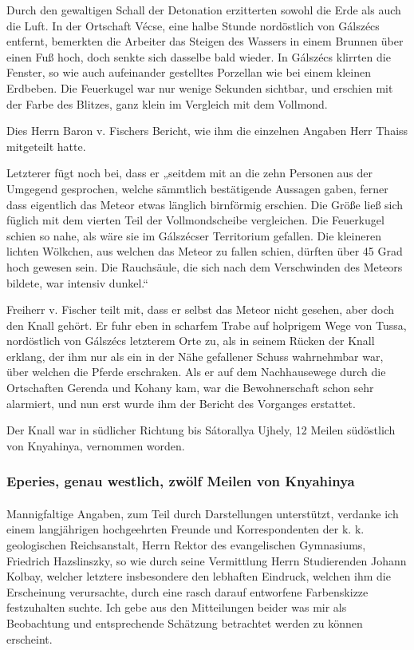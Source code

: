 \documentclass[a4paper, 11pt, oneside, german]{article}
\begin{document}
Durch den gewaltigen Schall der Detonation erzitterten sowohl die Erde als auch die Luft. In der Ortschaft Vécse, eine halbe Stunde nordöstlich von Gálszécs entfernt, bemerkten die Arbeiter das Steigen des Wassers in einem Brunnen über einen Fuß hoch, doch senkte sich dasselbe bald wieder. In Gálszécs klirrten die Fenster, so wie auch aufeinander gestelltes Porzellan wie bei einem kleinen Erdbeben. Die Feuerkugel war nur wenige Sekunden sichtbar, und erschien mit der Farbe des Blitzes, ganz klein im Vergleich mit dem Vollmond.

Dies Herrn Baron v. Fischers Bericht, wie ihm die einzelnen Angaben Herr Thaiss mitgeteilt hatte.

Letzterer fügt noch bei, dass er „seitdem mit an die zehn Personen aus der Umgegend gesprochen, welche sämmtlich bestätigende Aussagen gaben, ferner dass eigentlich das Meteor etwas länglich birnförmig erschien. Die Größe ließ sich füglich mit dem vierten Teil der Vollmondscheibe vergleichen. Die Feuerkugel schien so nahe, als wäre sie im Gálszécser Territorium gefallen. Die kleineren lichten Wölkchen, aus welchen das Meteor zu fallen schien, dürften über 45 Grad hoch gewesen sein. Die Rauchsäule, die sich nach dem Verschwinden des Meteors bildete, war intensiv dunkel.“

Freiherr v. Fischer teilt mit, dass er selbst das Meteor nicht gesehen, aber doch den Knall gehört. Er fuhr eben in scharfem Trabe auf holprigem Wege von Tussa, nordöstlich von Gálszécs letzterem Orte zu, als in seinem Rücken der Knall erklang, der ihm nur als ein in der Nähe gefallener Schuss wahrnehmbar war, über welchen die Pferde erschraken. Als er auf dem Nachhausewege durch die Ortschaften Gerenda und Kohany kam, war die Bewohnerschaft schon sehr alarmiert, und nun erst wurde ihm der Bericht des Vorganges erstattet.

Der Knall war in südlicher Richtung bis Sátorallya Ujhely, 12 Meilen südöstlich von Knyahinya, vernommen worden.
\clearpage
\subsubsection{Eperies, genau westlich, zwölf Meilen von Knyahinya}
\paragraph{}
Mannigfaltige Angaben, zum Teil durch Darstellungen unterstützt, verdanke ich einem langjährigen hochgeehrten Freunde und Korrespondenten der k. k. geologischen Reichsanstalt, Herrn Rektor des evangelischen Gymnasiums, Friedrich Hazslinszky, so wie durch seine Vermittlung Herrn Studierenden Johann Kolbay, welcher letztere insbesondere den lebhaften Eindruck, welchen ihm die Erscheinung verursachte, durch eine rasch darauf entworfene Farbenskizze festzuhalten suchte. Ich gebe aus den Mitteilungen beider was mir als Beobachtung und entsprechende Schätzung betrachtet werden zu können erscheint.
\end{document}
